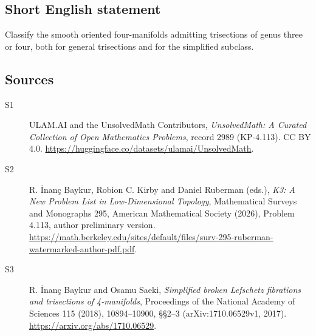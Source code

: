 \documentclass[11pt]{article}
\begin{document}
\subsection{Short English statement}
Classify the smooth oriented four-manifolds admitting trisections of genus three or four, both for general trisections and for the simplified subclass.
\subsection{Sources}
\begin{description}
\item[\hypertarget{source:2989:1}{S1}] ULAM.AI and the UnsolvedMath Contributors, \emph{UnsolvedMath: A Curated Collection of Open Mathematics Problems}, record 2989 (KP-4.113). CC BY 4.0. \url{https://huggingface.co/datasets/ulamai/UnsolvedMath}.
\item[\hypertarget{source:2989:2}{S2}] R. İnanç Baykur, Robion C. Kirby and Daniel Ruberman (eds.), \emph{K3: A New Problem List in Low-Dimensional Topology}, Mathematical Surveys and Monographs 295, American Mathematical Society (2026), Problem 4.113, author preliminary version. \url{https://math.berkeley.edu/sites/default/files/surv-295-ruberman-watermarked-author-pdf.pdf}.
\item[\hypertarget{source:2989:3}{S3}] R. İnanç Baykur and Osamu Saeki, \emph{Simplified broken Lefschetz fibrations and trisections of 4-manifolds}, Proceedings of the National Academy of Sciences 115 (2018), 10894--10900, §§2--3 (arXiv:1710.06529v1, 2017). \url{https://arxiv.org/abs/1710.06529}.
\end{description}
\label{end:2989}
\end{document}

